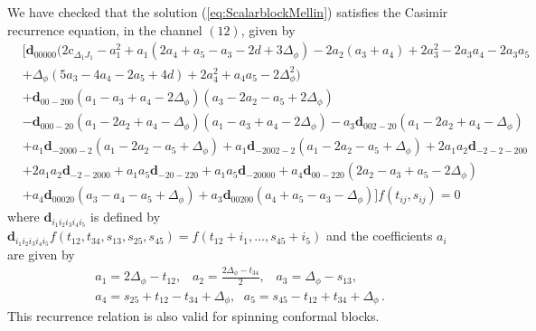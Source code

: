 We have checked that the solution (\ref{eq:ScalarblockMellin}) satisfies the Casimir recurrence equation, in the channel $(12)$,    given by 
\begin{align}
   & \big[\mathbf{d}_{00000} \big(2 \textrm{c}_{\Delta_1J_1}-a_1^2+a_1 (2 a_4+a_5-a_3-2 d+3 \Delta_\phi )-2 a_2 (a_3+a_4)+2 a_3^2-2 a_3 a_4-2 a_3 a_5\nonumber                 \\
   & +\Delta_\phi  (5 a_3-4 a_4-2 a_5+4 d)+2 a_4^2+a_4 a_5-2 \Delta_\phi ^2\big)\nonumber\\
   &+\mathbf{d}_{00-200} (a_1-a_3+a_4-2 \Delta_\phi ) (a_3-2 a_2-a_5+2 \Delta_\phi )\nonumber \\
   & -\mathbf{d}_{000-20} (a_1-2 a_2+a_4-\Delta_\phi ) (a_1-a_3+a_4-2 \Delta_\phi )-a_3 \mathbf{d}_{002-20} (a_1-2 a_2+a_4-\Delta_\phi )\nonumber                         \\
   & +a_1 \mathbf{d}_{-2000-2} (a_1-2 a_2-a_5+\Delta_\phi )+a_1 \mathbf{d}_{-2002-2} (a_1-2 a_2-a_5+\Delta_\phi )+2 a_1 a_2 \mathbf{d}_{-2-2-200}\nonumber                \\
   & +2 a_1 a_2 \mathbf{d}_{-2-2000}+a_1 a_5 \mathbf{d}_{-20-220}+a_1 a_5 \mathbf{d}_{-20000}+a_4 \mathbf{d}_{00-220} (2 a_2-a_3+a_5-2 \Delta_\phi )\nonumber             \\
   & +a_4 \mathbf{d}_{00020} (a_3-a_4-a_5+\Delta_\phi )+a_3 \mathbf{d}_{00200} (a_4+a_5-a_3-\Delta_\phi )\big]f(t_{ij},s_{ij})=0\label{eq:recurrencerelationsMellinCasi}
\end{align}
where $\mathbf{d}_{i_1i_2i_3i_4i_5}$ is defined by $\mathbf{d}_{i_1i_2i_3i_4i_5}f(t_{12},t_{34},s_{13},s_{25},s_{45})=f(t_{12}+i_1,\dots,s_{45}+i_5)$ and the coefficients $a_i$ are given by
\begin{align}
   & a_1= 2 \Delta_\phi -t_{12},\, \ \ \  a_2= \frac{2 \Delta_\phi -t_{34}}{2} ,\, \ \ \ a_3 =  \Delta_\phi -s_{13}, \\
   & a_4= s_{25}+t_{12}-t_{34}+\Delta_\phi ,\, \ \ a_5=  s_{45}-t_{12}+t_{34}+\Delta_\phi\,.\nonumber
\end{align}
This recurrence relation is also valid for spinning conformal blocks.
